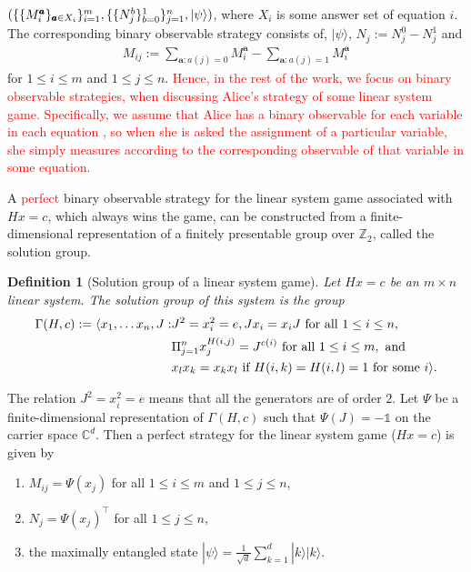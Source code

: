\documentclass[11pt,letterpaper]{article}
\newcommand{\ket}[1]{|#1\rangle}
\newcommand{\tp}{^\intercal}
\DeclarePairedDelimiter{\ip}{\langle}{\rangle}
\newcommand{\C}{\mathbb{C}}
\newcommand{\Z}{\mathbb{Z}}
\newcommand{\1}{\mathbb{1}}
\newcommand{\ba}{\pmb{a}}
\newcommand{\sd}{\sqrt{d}}
\newcommand{\hf}[1]{\textcolor{red}{#1}}
\newtheorem{definition}[theorem]{Definition}
\theoremstyle{definition}
\begin{document}
$(\{\{M_i^{\ba}\}_{\ba \in X_i}\}_{i=1}^m, \{\{N_j^b\}_{b=0}^1\}_{j=1}^n,\\ \ket{\psi})$, where $X_i$ is some answer set of equation $i$.
The corresponding binary observable
strategy consists of, $\ket{\psi}$, $N_j := N_j^0 - N_j^1$ and
\begin{align*}
    M_{ij} := \sum_{\ba: a(j)=0} M_i^{\ba} - \sum_{\ba: a(j) =1}
    M_i^{\ba}
\end{align*}
for $1\leq i \leq m$ and $1 \leq j \leq n$. 
\hf{
Hence, in the rest of the work, we focus on binary observable strategies,
when discussing Alice's strategy of some linear system game.
Specifically, we assume that Alice has a binary observable for each variable
in each equation ,
so when she is asked the assignment of a particular variable, she simply
measures according to the corresponding observable of that variable in some equation.}


A \hf{perfect} binary observable strategy for the linear system game associated with $Hx = c$, which always wins the game, can be constructed from
a finite-dimensional representation of a finitely presentable group
over $\Z_2$, called the solution group. 
\begin{definition}[Solution group of a linear system game]
	\label{def:presentation}
	Let $Hx = c$ be an $m \times n$ linear system. The solution group of this system
	is the group
	\begin{align*}
		\Gamma(H,c) := \ip{
		x_1,\dots x_n, J: &J^2 = x_i^2 = e, Jx_i = x_iJ \text{ for all }1 \leq i \leq n, \\
				& \Pi_{j=1}^n x_j^{H(i,j)} = J^{c(i)} \text{ for all } 1 \leq i \leq m, \text{ and } \\
				& x_l x_k = x_k x_l \text{ if } H(i,k) = H(i,l) = 1 \text{ for some } i
				}.
	\end{align*}
\end{definition}
The relation $J^2 = x_i^2 = e$ means that all the generators are of order $2$.
Let $\Psi$ be a finite-dimensional representation of $\Gamma(H, c)$ such that $\Psi(J) = -\1$ on the carrier space $\C^d$. 
Then a perfect strategy for 
the linear system game ($Hx = c$) is given by 
\begin{enumerate}
	\item $M_{ij} = \Psi(x_j)$ for all $ 1 \leq i \leq m$ and $1 \leq j \leq n$,
	\item $N_j = \Psi(x_j)\tp$ for all $1 \leq j \leq n$, 
	\item the maximally entangled state $\ket{\psi} = \frac{1}{\sd} \sum_{k=1}^d \ket{k}\ket{k}$.
\end{enumerate}
\end{document}
